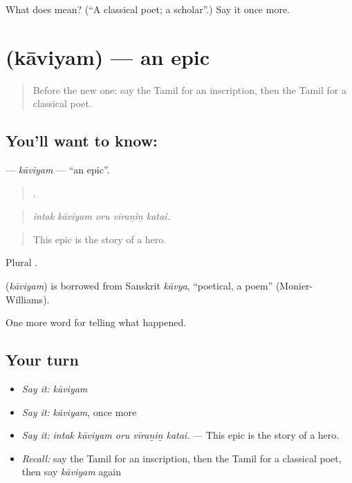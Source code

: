 \begin{tcolorbox}[breakable,colback=teal!4,colframe=teal!35!black,title={Before you move on}]
What does  mean? (\textquotedblleft{}A classical poet; a scholar\textquotedblright{}.) Say it once more.
\end{tcolorbox}
\section[\texorpdfstring{\ta{காவியம்} (kāviyam)}{காவியம் (kāviyam)}]{ (kāviyam) — an epic}

\label{lesson:TA-C325-kaviyam}



\begin{quote}
Before the new one: say the Tamil for an inscription, then the Tamil for a classical poet.
\end{quote}

\subsection*{You'll want to know: }
\textbf{} — \emph{kāviyam} — \textquotedblleft{}an epic\textquotedblright{}.

\begin{quote}
    .
\end{quote}

\begin{quote}
\emph{intak kāviyam oru vīraṉiṉ katai.}
\end{quote}

\begin{quote}
This epic is the story of a hero.
\end{quote}

Plural .

\begin{cousinweb}
\textbf{} (\emph{kāviyam}) is borrowed from Sanskrit \emph{kāvya}, \textquotedblleft{}poetical, a poem\textquotedblright{} (Monier-Williams).
\end{cousinweb}

\begin{grammarlens}[title={What you've built}]
One more word for telling what happened.
\end{grammarlens}

\subsection*{Your turn}
\begin{itemize}
\raggedright
  \item \emph{Say it:} \emph{kāviyam}
  \item \emph{Say it:} \emph{kāviyam}, once more
  \item \emph{Say it:} \emph{intak kāviyam oru vīraṉiṉ katai.} — This epic is the story of a hero.
  \item \emph{Recall:} say the Tamil for an inscription, then the Tamil for a classical poet, then say \emph{kāviyam} again
\end{itemize}

